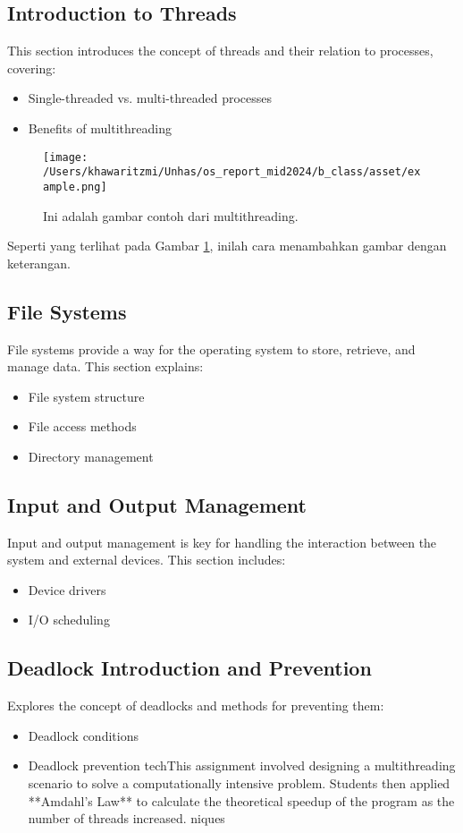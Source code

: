 \documentclass[12pt]{article}
\begin{document}
\subsection{Introduction to Threads}
This section introduces the concept of threads and their relation to processes, covering:
\begin{itemize}
    \item Single-threaded vs. multi-threaded processes
    \item Benefits of multithreading
\end{itemize}

\begin{figure}[h]
    \centering
    \texttt{[image: /Users/khawaritzmi/Unhas/os\_report\_mid2024/b\_class/asset/example.png]}  %
    \caption{Ini adalah gambar contoh dari multithreading.}
    \label{fig:contoh_gambar}
\end{figure}

Seperti yang terlihat pada Gambar \ref{fig:contoh_gambar}, inilah cara menambahkan gambar dengan keterangan.

\subsection{File Systems}
File systems provide a way for the operating system to store, retrieve, and manage data. This section explains:
\begin{itemize}
    \item File system structure
    \item File access methods
    \item Directory management
\end{itemize}

\subsection{Input and Output Management}
Input and output management is key for handling the interaction between the system and external devices. This section includes:
\begin{itemize}
    \item Device drivers
    \item I/O scheduling
\end{itemize}

\subsection{Deadlock Introduction and Prevention}
Explores the concept of deadlocks and methods for preventing them:
\begin{itemize}
    \item Deadlock conditions
    \item Deadlock prevention techThis assignment involved designing a multithreading scenario to solve a computationally intensive problem. Students then applied **Amdahl's Law** to calculate the theoretical speedup of the program as the number of threads increased.
niques
\end{itemize}
\end{document}
